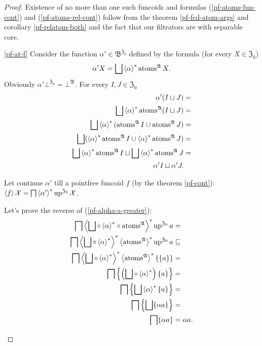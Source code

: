 \begin{proof}
Existence of no more than one such funcoids and formulas (\ref{pf-atoms-fun-cont})
and (\ref{pf-atoms-rel-cont}) follow from the theorem \ref{pf-fcd-atom-args}
and corollary \ref{pf-relatom-both} and the fact that our filtrators
are with separable core.
\begin{widedisorder}
\item [{\ref{pf-at-f}}] Consider the function $\alpha'\in\mathfrak{B}^{\mathfrak{Z}_{0}}$
defined by the formula (for every $X\in\mathfrak{Z}_{0}$) 
\[
\alpha'X=\bigsqcup\left\langle \alpha\right\rangle ^{\ast}\operatorname{atoms}^{\mathfrak{A}}X.
\]
Obviously $\alpha'\bot^{\mathfrak{Z}_{0}}=\bot^{\mathfrak{B}}$. For every
$I,J\in\mathfrak{Z}_{0}$
\begin{align*}
\alpha'(I\sqcup J) & =\\
\bigsqcup\left\langle \alpha\right\rangle ^{\ast}\operatorname{atoms}^{\mathfrak{A}}(I\sqcup J) & =\\
\bigsqcup\left\langle \alpha\right\rangle ^{\ast}(\operatorname{atoms}^{\mathfrak{A}}I\cup\operatorname{atoms}^{\mathfrak{A}}J) & =\\
\bigsqcup(\left\langle \alpha\right\rangle ^{\ast}\operatorname{atoms}^{\mathfrak{A}}I\cup\left\langle \alpha\right\rangle ^{\ast}\operatorname{atoms}^{\mathfrak{A}}J) & =\\
\bigsqcup\left\langle \alpha\right\rangle ^{\ast}\operatorname{atoms}^{\mathfrak{A}}I\sqcup\bigsqcup\left\langle \alpha\right\rangle ^{\ast}\operatorname{atoms}^{\mathfrak{A}}J & =\\
\alpha'I\sqcup\alpha'J.
\end{align*}



Let continue $\alpha'$ till a pointfree funcoid $f$ (by the theorem
\ref{pf-cont}): $\left\langle f\right\rangle\mathcal{X}=\bigsqcap\left\langle \alpha'\right\rangle ^{\ast}\operatorname{up}^{\mathfrak{Z}_{0}}\mathcal{X}$.


Let's prove the reverse of (\ref{pf-alpha-a-greater}):
\begin{align*}
\bigsqcap\left\langle \bigsqcup\circ\left\langle \alpha\right\rangle ^{\ast}\circ\operatorname{atoms}^{\mathfrak{A}}\right\rangle ^{\ast}\operatorname{up}^{\mathfrak{Z}_{0}}a & =\\
\bigsqcap\left\langle \bigsqcup\circ\left\langle \alpha\right\rangle ^{\ast}\right\rangle ^{\ast}\left\langle \operatorname{atoms}^{\mathfrak{A}}\right\rangle ^{\ast}\operatorname{up}^{\mathfrak{Z}_{0}}a & \sqsubseteq\\
\bigsqcap\left\langle \bigsqcup\circ\left\langle \alpha\right\rangle ^{\ast}\right\rangle ^{\ast}\left\langle \operatorname{atoms}^{\mathfrak{A}}\right\rangle ^{\ast}\{\{a\}\} & =\\
\bigsqcap\left\{ \left(\bigsqcup\circ\left\langle \alpha\right\rangle ^{\ast}\right)\{a\}\right\}  & =\\
\bigsqcap\left\{ \bigsqcup\left\langle \alpha\right\rangle ^{\ast}\{a\}\right\}  & =\\
\bigsqcap\left\{ \bigsqcup\{\alpha a\}\right\}  & =\\
\bigsqcap\{\alpha a\} & =\alpha a.
\end{align*}




\end{widedisorder}
\end{proof}
